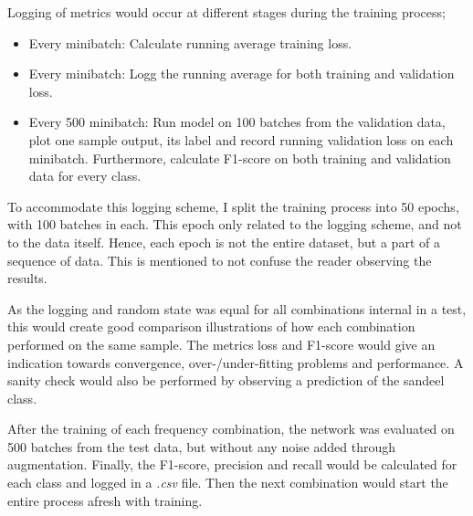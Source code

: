         Logging of metrics would occur at different stages during the training process;
            \begin{itemize}
                \item Every minibatch: Calculate running average training loss.
                \item Every minibatch: Logg the running average for both training and validation loss.
                \item Every 500 minibatch: Run model on 100 batches from the validation data, plot one sample output, its label and record running validation loss on each minibatch. Furthermore, calculate F1-score on both training and validation data for every class.
            \end{itemize}
        To accommodate this logging scheme, I split the training process into 50 epochs, with 100 batches in each. This epoch only related to the logging scheme, and not to the data itself. Hence, each epoch is not the entire dataset, but a part of a sequence of data. This is mentioned to not confuse the reader observing the results.
    
        As the logging and random state was equal for all combinations internal in a test, this would create good comparison illustrations of how each combination performed on the same sample. The metrics loss and F1-score would give an indication towards convergence, over-/under-fitting problems and performance. A sanity check would also be performed by observing a prediction of the sandeel class.
        
        After the training of each frequency combination, the network was evaluated on 500 batches from the test data, but without any noise added through augmentation. Finally, the F1-score, precision and recall would be calculated for each class and logged in a \textit{.csv} file. Then the next combination would start the entire process afresh with training.
        
